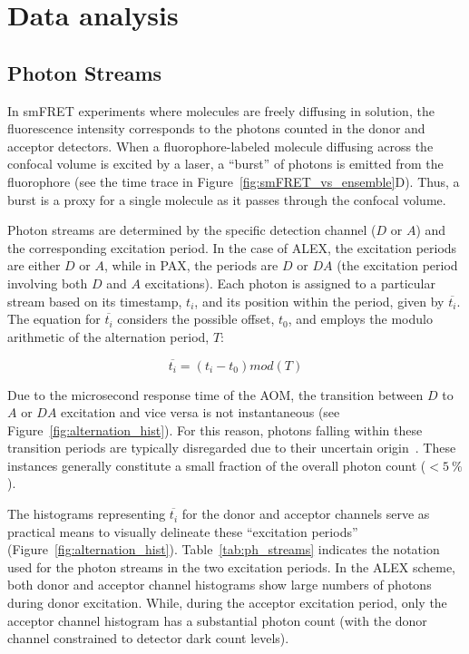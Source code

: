 \chapter{Data analysis}
\label{chpt:analysis_appendix}

\section{Photon Streams}
\label{sec:photon_streams_apdx}

In \ac{smFRET} experiments where molecules are freely diffusing in solution, the fluorescence intensity corresponds to the photons counted in the donor and acceptor detectors.
When a fluorophore-labeled molecule diffusing across the confocal volume is excited by a laser, a \enquote{burst} of photons is emitted from the fluorophore (see the time trace in Figure~\ref{fig:smFRET_vs_ensemble}D). 
Thus, a burst is a proxy for a single molecule as it passes through the confocal volume.

Photon streams are determined by the specific detection channel ($D$ or $A$) and the corresponding excitation period. 
In the case of \ac{ALEX}, the excitation periods are either $D$ or $A$, while in \ac{PAX}, the periods are $D$ or $DA$ (the excitation period involving both $D$ and $A$ excitations). 
Each photon is assigned to a particular stream based on its timestamp, $t_i$, and its position within the period, given by $\overline{t_i}$.
The equation for $\overline{t_i}$ considers the possible offset, $t_0$, and employs the modulo arithmetic of the alternation period, $T$:

\begin{equation}
\label{eqn:reduced_t}
\overline{t_i} = (t_i-t_0)mod(T)
\end{equation}

Due to the microsecond response time of the \ac{AOM}, the transition between $D$ to $A$ or $DA$ excitation and vice versa is not instantaneous (see Figure~\ref{fig:alternation_hist}). 
For this reason, photons falling within these transition periods are typically disregarded due to their uncertain origin~\cite{ingargiola_PLOS1_2016}. 
These instances generally constitute a small fraction of the overall photon count ($< 5~\%$).

The histograms representing $\overline{t_i}$ for the donor and acceptor channels serve as practical means to visually delineate these \enquote{excitation periods}\cite{ingargiola_PLOS1_2016} (Figure~\ref{fig:alternation_hist}). 
Table~\ref{tab:ph_streams} indicates the notation used for the photon streams in the two excitation periods.
In the \ac{ALEX} scheme, both donor and acceptor channel histograms show large numbers of photons during donor excitation.
While, during the acceptor excitation period, only the acceptor channel histogram has a substantial photon count (with the donor channel constrained to detector dark count levels).

